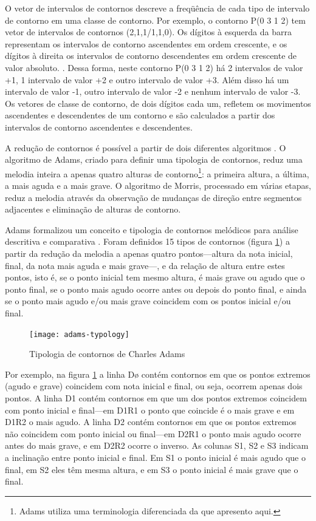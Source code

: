 O vetor de intervalos de contornos descreve a freqüência de cada tipo
de intervalo de contorno em uma classe de contorno. Por exemplo, o
contorno P(0 3 1 2) tem vetor de intervalos de contornos
(2,1,1/1,1,0). Os dígitos à esquerda da barra representam os
intervalos de contorno ascendentes em ordem crescente, e os dígitos à
direita os intervalos de contorno descendentes em ordem crescente de
valor absoluto. \cite{friedmann85:methodology}. Dessa forma, neste
contorno P(0 3 1 2) há 2 intervalos de valor +1, 1 intervalo de valor
+2 e outro intervalo de valor +3. Além disso há um intervalo de valor
-1, outro intervalo de valor -2 e nenhum intervalo de valor -3. Os
vetores de classe de contorno, de dois dígitos cada um, refletem os
movimentos ascendentes e descendentes de um contorno e são calculados
a partir dos intervalos de contorno ascendentes e descendentes.

A redução de contornos é possível a partir de dois diferentes
algoritmos \cite{adams76:melodic,morris93:directions}. O algoritmo de
Adams, criado para definir uma tipologia de contornos, reduz uma
melodia inteira a apenas quatro alturas de contorno\footnote{Adams
  utiliza uma terminologia diferenciada da que apresento aqui.}: a
primeira altura, a última, a mais aguda e a mais grave. O algoritmo de
Morris, processado em várias etapas, reduz a melodia através da
observação de mudanças de direção entre segmentos adjacentes e
eliminação de alturas de contorno.

Adams formalizou um conceito e tipologia de contornos melódicos para
análise descritiva e comparativa \cite{adams76:melodic}. Foram
definidos 15 tipos de contornos (figura \ref{fig:adams-typology}) a
partir da redução da melodia a apenas quatro pontos---altura da nota
inicial, final, da nota mais aguda e mais grave---, e da relação de
altura entre estes pontos, isto é, se o ponto inicial tem mesmo
altura, é mais grave ou agudo que o ponto final, se o ponto mais agudo
ocorre antes ou depois do ponto final, e ainda se o ponto mais agudo
e/ou mais grave coincidem com os pontos inicial e/ou final.

\begin{figure}
  \centering
  \texttt{[image: adams-typology]}
  \caption{Tipologia de contornos de Charles Adams}
  \label{fig:adams-typology}
\end{figure}

Por exemplo, na figura \ref{fig:adams-typology} a linha Dø contém
contornos em que os pontos extremos (agudo e grave) coincidem com nota
inicial e final, ou seja, ocorrem apenas dois pontos. A linha D1
contém contornos em que um dos pontos extremos coincidem com ponto
inicial e final---em D1R1 o ponto que coincide é o mais grave e em
D1R2 o mais agudo. A linha D2 contém contornos em que os pontos
extremos não coincidem com ponto inicial ou final---em D2R1 o ponto
mais agudo ocorre antes do mais grave, e em D2R2 ocorre o inverso. As
colunas S1, S2 e S3 indicam a inclinação entre ponto inicial e
final. Em S1 o ponto inicial é mais agudo que o final, em S2 eles têm
mesma altura, e em S3 o ponto inicial é mais grave que o final.

